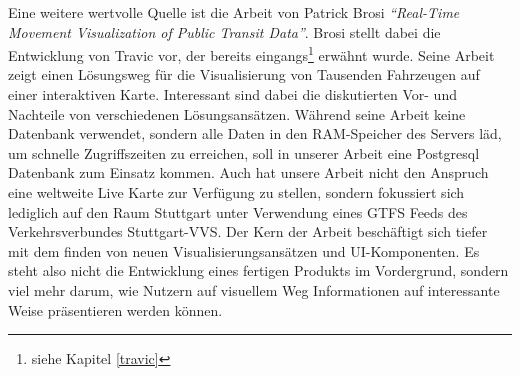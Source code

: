 \begin{newpage}
    Eine weitere wertvolle Quelle ist die Arbeit von Patrick Brosi \textit{"`Real-Time Movement Visualization of Public Transit Data"'}\parencite{brosi}. Brosi stellt dabei die Entwicklung von Travic vor, der bereits eingangs\footnote{siehe Kapitel \ref{travic}} erwähnt wurde. Seine Arbeit zeigt einen Lösungsweg für die Visualisierung von Tausenden Fahrzeugen auf einer interaktiven Karte. Interessant sind dabei die diskutierten Vor- und Nachteile von verschiedenen Lösungsansätzen.
    Während seine Arbeit keine Datenbank verwendet, sondern alle Daten in den RAM-Speicher des Servers läd, um schnelle Zugriffszeiten zu erreichen, soll in unserer Arbeit eine Postgresql Datenbank zum Einsatz kommen. 
    Auch hat unsere Arbeit nicht den Anspruch eine weltweite Live Karte zur Verfügung zu stellen, sondern fokussiert sich lediglich auf den Raum Stuttgart unter Verwendung eines GTFS Feeds des Verkehrsverbundes Stuttgart-VVS. 
    Der Kern der Arbeit beschäftigt sich tiefer mit dem finden von neuen Visualisierungsansätzen und UI-Komponenten. Es steht also nicht die Entwicklung eines fertigen Produkts im Vordergrund, sondern viel mehr darum, wie Nutzern auf visuellem Weg Informationen auf interessante Weise präsentieren werden können.


\end{newpage}